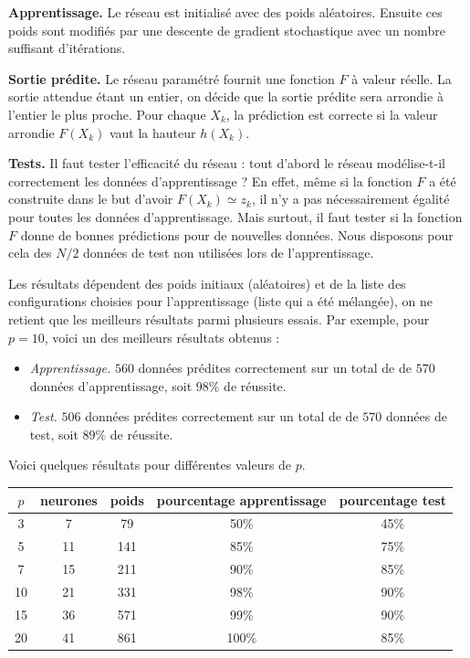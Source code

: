 {


\textbf{Apprentissage.}
Le réseau est initialisé avec des poids aléatoires. Ensuite ces poids sont modifiés par une descente de gradient stochastique avec un nombre suffisant d'itérations.

\textbf{Sortie prédite.}
Le réseau paramétré fournit une fonction $F$ à valeur réelle. La sortie attendue étant un entier, on décide que la sortie prédite sera arrondie à l'entier le plus proche.
Pour chaque $X_k$, la prédiction est correcte si la valeur arrondie $F(X_k)$ vaut la hauteur $h(X_k)$. 


\textbf{Tests.}
Il faut tester l'efficacité du réseau : tout d'abord le réseau modélise-t-il correctement les données d'apprentissage ? En effet, même si la fonction $F$ a été construite dans le but d'avoir $F(X_k) \simeq z_k$, il n'y a pas nécessairement égalité pour toutes les données d'apprentissage. Mais surtout, il faut tester si la fonction $F$ donne de bonnes prédictions pour de nouvelles données. Nous disposons pour cela des $N/2$ données de test non utilisées lors de l'apprentissage.

Les résultats dépendent des poids initiaux (aléatoires) et de la liste des configurations choisies pour l'apprentissage (liste qui a été mélangée), on ne retient que les meilleurs résultats parmi plusieurs essais.
Par exemple, pour $p=10$, voici un des meilleurs résultats obtenus :
\begin{itemize}
	\item \emph{Apprentissage.} $560$ données prédites correctement sur un total de de $570$ données d'apprentissage, soit $98\%$ de réussite.
	
	\item \emph{Test.} $506$ données prédites correctement sur un total de de $570$ données de test, soit $89\%$ de réussite.
\end{itemize}

Voici quelques résultats pour différentes valeurs de $p$.

\begin{center}
	\begin{tabular}{c|c|c|c|c}
		$p$ & {neurones} & {poids} & {pourcentage apprentissage} & {pourcentage test} \\ \hline
		3 & 7 & 79 & 50\% & 45\% \\
		5 & 11 & 141 & 85\% & 75\% \\
		7 & 15 & 211 & 90\% & 85\% \\
		10 & 21 & 331 & 98\% & 90\% \\
		15 & 36 & 571 & 99\% & 90\% \\
		20 & 41 & 861 & 100\% & 85\% \\
	\end{tabular}
\end{center}

}
